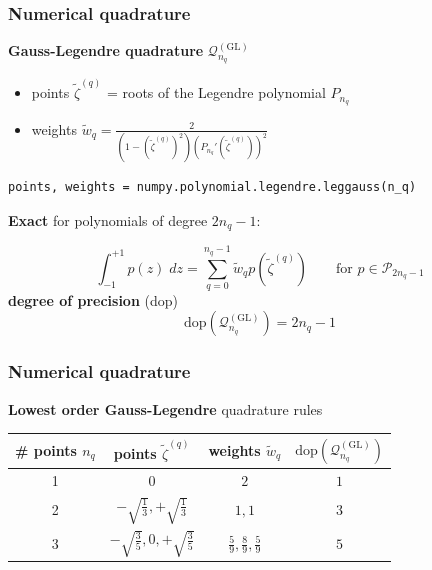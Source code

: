 \documentclass{beamer}
\begin{document}

\begin{frame}[fragile]
\frametitle{Numerical quadrature}
\textbf{Gauss-Legendre quadrature} $\mathcal{Q}^{(\text{GL})}_{n_q}$
\begin{itemize}
 \item points $\widetilde{\zeta}^{(q)}$ = roots of the Legendre polynomial $P_{n_q}$
 \item weights $\widetilde{w}_q = \frac{2}{(1-(\widetilde{\zeta}^{(q)})^2)(P_{n_q}'(\widetilde{\zeta}^{(q)}))^2}$
\end{itemize}

\begin{lstlisting}
points, weights = numpy.polynomial.legendre.leggauss(n_q)
\end{lstlisting}
\textbf{Exact} for polynomials of degree $2n_q-1$:

$$
\int_{-1}^{+1} p(z)\;dz = \sum_{q=0}^{n_q-1} \widetilde{w}_q p(\widetilde{\zeta}^{(q)})\qquad\text{for $p\in\mathcal{P}_{2n_q-1}$}
$$
\textbf{degree of precision} (dop)
$$
\text{dop}(\mathcal{Q}^{(\text{GL})}_{n_q}) = 2n_q-1
$$
\end{frame}


\begin{frame}[fragile]
\frametitle{Numerical quadrature}
\textbf{Lowest order Gauss-Legendre} quadrature rules
\begin{center}
  \renewcommand{\arraystretch}{2.5}
  \begin{tabular}{cccc}
    \hline
    \# points $n_q$ & points $\widetilde{\zeta}^{(q)}$ & weights $\widetilde{w}_q$ & $\text{dop}(\mathcal{Q}^{(\text{GL})}_{n_q})$\\
    \hline\hline
 1   & $0$ & $2$ & $1$\\
 2   & $-\sqrt{\frac{1}{3}}, +\sqrt{\frac{1}{3}}$ & $1,1$ & $3$\\
 3   & $-\sqrt{\frac{3}{5}},0,+\sqrt{\frac{3}{5}}$ & $\frac{5}{9},\frac{8}{9},\frac{5}{9}$ & $5$\\
 \hline
  \end{tabular}
\end{center}
\end{frame}

\end{document}

